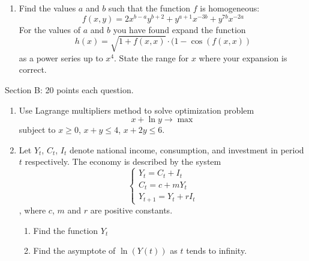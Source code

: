 \documentclass[12pt]{article} %
\theoremstyle{definition} %
\begin{document}
\begin{enumerate}

\item Find the values $a$ and $b$ such that the function $f$ is homogeneous:
\[f(x,y)=2x^{b-a}y^{b+2}+y^{a+1}x^{-3b}+y^{7b}x^{-2a}\]
For the values of $a$ and $b$ you have found expand the function \[h(x)=\sqrt{1+f(x,x)}\cdot (1-\cos(f(x,x))\] as a power series up to $x^4$. State the range for $x$  where your expansion is correct.

\end{enumerate}


Section B: 20 points each question.
\begin{enumerate}

\item Use Lagrange multipliers method to solve optimization problem
\[x+\ln y\to \max\]
subject to
$x\geq 0$, $x+y\leq 4$, $x+2y\leq 6$.

\item Let $Y_t$, $C_t$, $I_t$ denote national income, consumption, and investment in period $t$ respectively. The economy is described by the system
\begin{equation}
\left\{
\begin{array}{l}
Y_t=C_t+I_t\\
C_t=c+mY_t\\
Y_{t+1}=Y_{t}+rI_t
\end{array}
\right.
\end{equation},
where $c$, $m$ and $r$ are positive constants.
\begin{enumerate}
\item Find the function $Y_t$
\item Find the asymptote of $\ln(Y(t))$ as $t$ tends to infinity.
\end{enumerate}


\end{enumerate}
\end{document}
